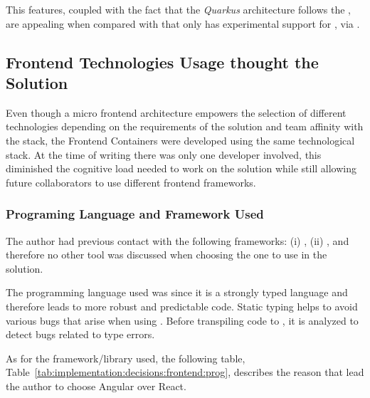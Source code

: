 This features, coupled with the fact that the \textit{Quarkus} architecture follows the , are appealing when compared with  that only has experimental support for , via .

\subsection{Frontend Technologies Usage thought the Solution}
\label{subsec:implementation:decisions:frontend}

Even though a micro frontend architecture empowers the selection of different technologies depending on the requirements of the solution and team affinity with the stack, the Frontend Containers were developed using the same technological stack. At the time of writing there was only one developer involved, this diminished the cognitive load needed to work on the solution while still allowing future collaborators to use different frontend frameworks.

\subsubsection*{Programing Language and Framework Used}
\label{subsubsec:implementation:decisions:frontend:prog}

The author had previous contact with the following frameworks: (i) , (ii) , and therefore no other tool was discussed when choosing the one to use in the solution.

The programming language used was  since it is a strongly typed language and therefore leads to more robust and predictable code. Static typing helps to avoid various bugs that arise when using . Before transpiling  code to , it is analyzed to detect bugs related to type errors.

As for the framework/library used, the following table, Table~\ref{tab:implementation:decisions:frontend:prog}, describes the reason that lead the author to choose Angular over React.

